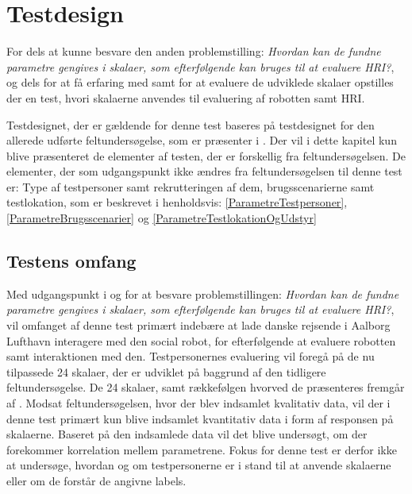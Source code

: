\chapter{Testdesign}
\label{TestAfSkalaTestdesign}
%
For dels at kunne besvare den anden problemstilling: \textit{Hvordan kan de fundne parametre gengives i skalaer, som efterfølgende kan bruges til at evaluere HRI?}, og dels for at få erfaring med samt for at evaluere de udviklede skalaer opstilles der en test, hvori skalaerne anvendes til evaluering af robotten samt HRI. 

Testdesignet, der er gældende for denne test baseres på testdesignet for den allerede udførte feltundersøgelse, som er præsenter i . Der vil i dette kapitel kun blive præsenteret de elementer af testen, der er forskellig fra feltundersøgelsen. De elementer, der som udgangspunkt ikke ændres fra feltundersøgelsen til denne test er: Type af testpersoner samt rekrutteringen af dem, brugsscenarierne samt testlokation, som er beskrevet i henholdsvis: \autoref{ParametreTestpersoner}, \autoref{ParametreBrugsscenarier} og \autoref{ParametreTestlokationOgUdstyr} 
%
\section{Testens omfang}
\label{TestAfSkalaTestensOmfang}
%
Med udgangspunkt i og for at besvare problemstillingen: \textit{Hvordan kan de fundne parametre gengives i skalaer, som efterfølgende kan bruges til at evaluere HRI?}, vil omfanget af denne test primært indebære at lade danske rejsende i Aalborg Lufthavn interagere med den social robot, for efterfølgende at evaluere robotten samt interaktionen med den. Testpersonernes evaluering vil foregå på de nu tilpassede 24 skalaer, der er udviklet på baggrund af den tidligere feltundersøgelse. De 24 skalaer, samt rækkefølgen hvorved de præsenteres fremgår af . Modsat feltundersøgelsen, hvor der blev indsamlet kvalitativ data, vil der i denne test primært kun blive indsamlet kvantitativ data i form af responsen på skalaerne. Baseret på den indsamlede data vil det blive undersøgt, om der forekommer korrelation mellem parametrene. Fokus for denne test er derfor ikke at undersøge, hvordan og om testpersonerne er i stand til at anvende skalaerne eller om de forstår de angivne labels.
\newpage
